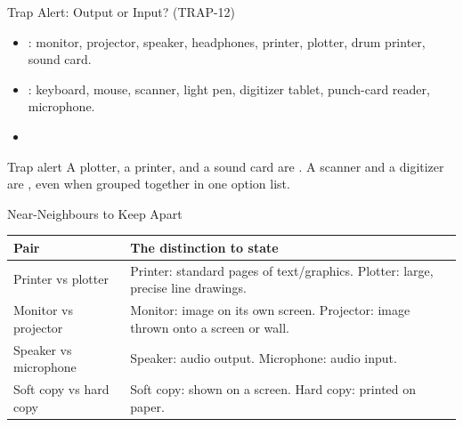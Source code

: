 \documentclass[aspectratio=169]{beamer}
\begin{document}
\begin{frame}{Trap Alert: Output or Input? (TRAP-12)}
  \begin{itemize}
    \item {}: monitor, projector, speaker, headphones, printer,
      plotter, drum printer, sound card.
    \item {}: keyboard, mouse, scanner, light pen, digitizer tablet,
      punch-card reader, microphone.
    \item {}
  \end{itemize}
  \begin{alertblock}{Trap alert}
    A plotter, a printer, and a sound card are . A scanner and a
    digitizer are , even when grouped together in one option list.
  \end{alertblock}
\end{frame}

\begin{frame}{Near-Neighbours to Keep Apart}
  \begin{center}
    \begin{tabular}{p{}p{}}
      \toprule
      \textbf{Pair} & \textbf{The distinction to state} \\
      \midrule
      Printer vs plotter & Printer: standard pages of text/graphics. Plotter: large, precise line drawings. \\
      Monitor vs projector & Monitor: image on its own screen. Projector: image thrown onto a screen or wall. \\
      Speaker vs microphone & Speaker: audio output. Microphone: audio input. \\
      Soft copy vs hard copy & Soft copy: shown on a screen. Hard copy: printed on paper. \\
      \bottomrule
    \end{tabular}
  \end{center}
\end{frame}
\end{document}
